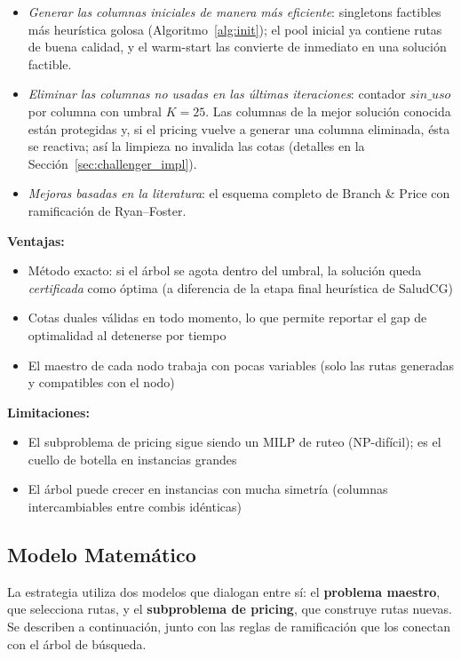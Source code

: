 \documentclass[12pt]{article}
\numberwithin{algorithm}{section}
\begin{document}
\begin{itemize}
    \item \emph{Generar las columnas iniciales de manera más eficiente}: singletons factibles más heurística golosa (Algoritmo~\ref{alg:init}); el pool inicial ya contiene rutas de buena calidad, y el warm-start las convierte de inmediato en una solución factible.
    \item \emph{Eliminar las columnas no usadas en las últimas iteraciones}: contador $\mathit{sin\_uso}$ por columna con umbral $K = 25$. Las columnas de la mejor solución conocida están protegidas y, si el pricing vuelve a generar una columna eliminada, ésta se reactiva; así la limpieza no invalida las cotas (detalles en la Sección~\ref{sec:challenger_impl}).
    \item \emph{Mejoras basadas en la literatura}: el esquema completo de Branch \& Price con ramificación de Ryan--Foster.
\end{itemize}

\textbf{Ventajas:}
\begin{itemize}
    \item Método exacto: si el árbol se agota dentro del umbral, la solución queda \emph{certificada} como óptima (a diferencia de la etapa final heurística de SaludCG)
    \item Cotas duales válidas en todo momento, lo que permite reportar el gap de optimalidad al detenerse por tiempo
    \item El maestro de cada nodo trabaja con pocas variables (solo las rutas generadas y compatibles con el nodo)
\end{itemize}

\textbf{Limitaciones:}
\begin{itemize}
    \item El subproblema de pricing sigue siendo un MILP de ruteo (NP-difícil); es el cuello de botella en instancias grandes
    \item El árbol puede crecer en instancias con mucha simetría (columnas intercambiables entre combis idénticas)
\end{itemize}

\subsection{Modelo Matemático}

La estrategia utiliza dos modelos que dialogan entre sí: el \textbf{problema maestro}, que selecciona rutas, y el \textbf{subproblema de pricing}, que construye rutas nuevas. Se describen a continuación, junto con las reglas de ramificación que los conectan con el árbol de búsqueda.
\end{document}
